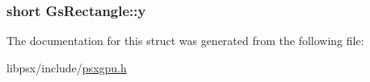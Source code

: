 \subsubsection[{y}]{\setlength{\rightskip}{0pt plus 5cm}short Gs\+Rectangle\+::y}\label{structGsRectangle_ae4ed9d3d091f0f0db713bd14eeacb760}


The documentation for this struct was generated from the following file\+:\begin{DoxyCompactItemize}
\item 
libpsx/include/\hyperlink{psxgpu_8h}{psxgpu.\+h}\end{DoxyCompactItemize}
